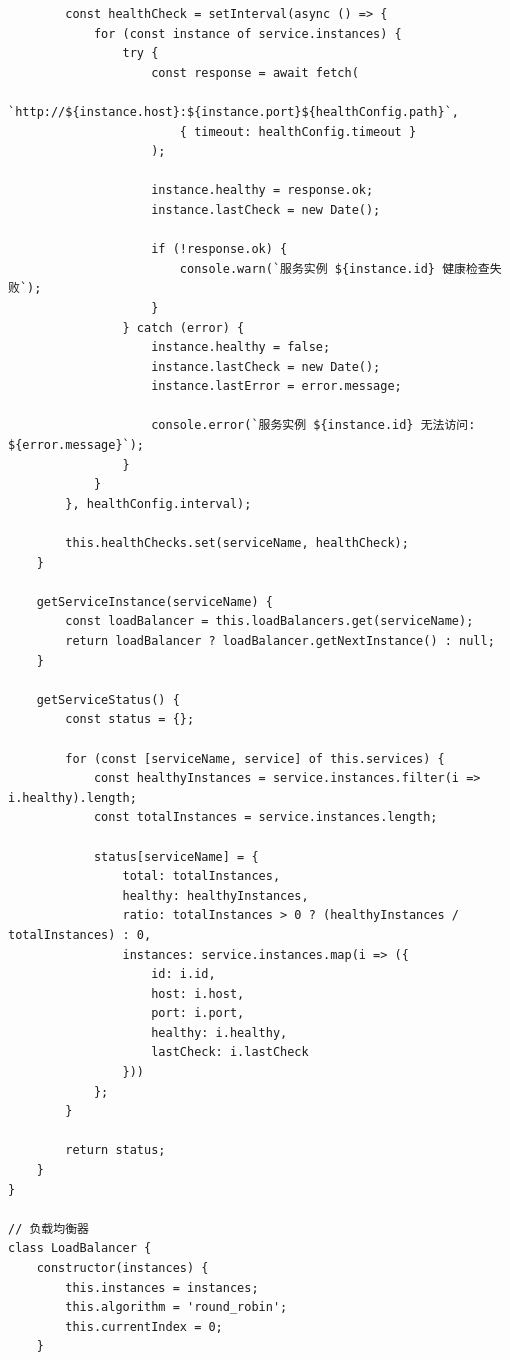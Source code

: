 \begin{lstlisting}
        const healthCheck = setInterval(async () => {
            for (const instance of service.instances) {
                try {
                    const response = await fetch(
                        `http://${instance.host}:${instance.port}${healthConfig.path}`,
                        { timeout: healthConfig.timeout }
                    );
                    
                    instance.healthy = response.ok;
                    instance.lastCheck = new Date();
                    
                    if (!response.ok) {
                        console.warn(`服务实例 ${instance.id} 健康检查失败`);
                    }
                } catch (error) {
                    instance.healthy = false;
                    instance.lastCheck = new Date();
                    instance.lastError = error.message;
                    
                    console.error(`服务实例 ${instance.id} 无法访问: ${error.message}`);
                }
            }
        }, healthConfig.interval);
        
        this.healthChecks.set(serviceName, healthCheck);
    }
    
    getServiceInstance(serviceName) {
        const loadBalancer = this.loadBalancers.get(serviceName);
        return loadBalancer ? loadBalancer.getNextInstance() : null;
    }
    
    getServiceStatus() {
        const status = {};
        
        for (const [serviceName, service] of this.services) {
            const healthyInstances = service.instances.filter(i => i.healthy).length;
            const totalInstances = service.instances.length;
            
            status[serviceName] = {
                total: totalInstances,
                healthy: healthyInstances,
                ratio: totalInstances > 0 ? (healthyInstances / totalInstances) : 0,
                instances: service.instances.map(i => ({
                    id: i.id,
                    host: i.host,
                    port: i.port,
                    healthy: i.healthy,
                    lastCheck: i.lastCheck
                }))
            };
        }
        
        return status;
    }
}

// 负载均衡器
class LoadBalancer {
    constructor(instances) {
        this.instances = instances;
        this.algorithm = 'round_robin';
        this.currentIndex = 0;
    }
    

\end{lstlisting}
